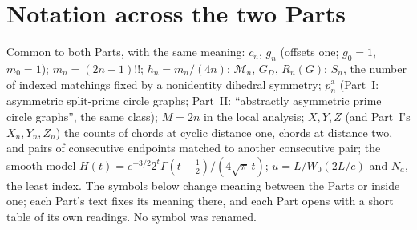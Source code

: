 \documentclass[11pt,letterpaper]{article}
\numberwithin{equation}{section}
\theoremstyle{definition}\newtheorem{definition}[theorem]{Definition}
\theoremstyle{remark}\newtheorem{remark}[theorem]{Remark}
\begin{document}
\section*{Notation across the two Parts}\label{cgr:sec:notation}
Common to both Parts, with the same meaning: $c_n$, $g_n$ (offsets one; $g_0=1$, $m_0=1$); $m_n=(2n-1)!!$; $h_n=m_n/(4n)$; $\mathcal M_n$, $G_D$, $R_n(G)$; $S_n$, the number of indexed matchings fixed by a nonidentity dihedral symmetry; $p_n^{\mathrm a}$ (Part~I: asymmetric split-prime circle graphs; Part~II: ``abstractly asymmetric prime circle graphs'', the same class); $M=2n$ in the local analysis; $X,Y,Z$ (and Part~I's $X_n,Y_n,Z_n$) the counts of chords at cyclic distance one, chords at distance two, and pairs of consecutive endpoints matched to another consecutive pair; the smooth model $H(t)=e^{-3/2}2^t\Gamma(t+\frac12)/(4\sqrt\pi\,t)$; $u=L/W_0(2L/e)$ and $N_a$, the least index. The symbols below change meaning between the Parts or inside one; each Part's text fixes its meaning there, and each Part opens with a short table of its own readings. No symbol was renamed.
\begingroup\small
\renewcommand{\theHtable}{cgr-notation.\arabic{table}}%
\end{document}

